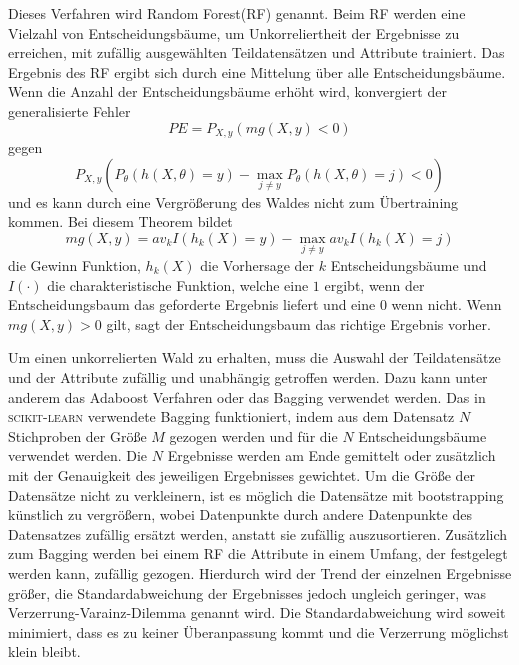 Dieses Verfahren wird Random Forest(RF) genannt. Beim RF werden eine Vielzahl von Entscheidungsbäume, um Unkorreliertheit der Ergebnisse zu erreichen, mit
zufällig ausgewählten Teildatensätzen und Attribute trainiert. Das Ergebnis des RF ergibt sich durch eine Mittelung über alle Entscheidungsbäume.
Wenn die Anzahl der Entscheidungsbäume erhöht wird, konvergiert der generalisierte Fehler
\begin{equation}
  PE = P_{X,y}(mg(X,y)<0)
\end{equation}
gegen
\begin{equation}
  P_{X,y}(P_\theta(h(X,\theta)=y)-\max_{j\neq y}P_\theta(h(X,\theta)=j)<0)
\end{equation}
und es kann durch eine Vergrößerung des Waldes nicht zum Übertraining kommen\cite[7]{RandomForests_Breiman}. Bei diesem Theorem bildet
\begin{equation}
  mg(X,y) = av_k I(h_k(X)=y) - \max_{j \neq y}av_k I(h_k(X)=j)
\end{equation}
die Gewinn Funktion, $h_k(X)$ die Vorhersage der $k$ Entscheidungsbäume und $I(\cdot)$ die charakteristische Funktion, welche eine $1$ ergibt, wenn der
Entscheidungsbaum das geforderte Ergebnis liefert und eine $0$ wenn nicht.
Wenn $mg(X,y) > 0$ gilt, sagt der Entscheidungsbaum das richtige Ergebnis vorher.

Um einen unkorrelierten Wald zu erhalten, muss die Auswahl der Teildatensätze und der Attribute zufällig und unabhängig getroffen werden.
Dazu kann unter anderem das Adaboost Verfahren oder das Bagging verwendet werden.
Das in \textsc{scikit-learn} verwendete Bagging funktioniert, indem aus dem Datensatz $N$ Stichproben der Größe $M$ gezogen werden und für die $N$ Entscheidungsbäume verwendet werden.
Die $N$ Ergebnisse werden am Ende gemittelt oder zusätzlich mit der Genauigkeit des jeweiligen Ergebnisses gewichtet.
Um die Größe der Datensätze nicht zu verkleinern, ist es möglich die Datensätze mit bootstrapping künstlich zu vergrößern, wobei Datenpunkte durch andere Datenpunkte
des Datensatzes zufällig ersätzt werden, anstatt sie zufällig auszusortieren.
Zusätzlich zum Bagging werden bei einem RF die Attribute in einem Umfang, der festgelegt werden kann, zufällig gezogen.
Hierdurch wird der Trend der einzelnen Ergebnisse größer, die Standardabweichung der Ergebnisses jedoch ungleich geringer,
was Verzerrung-Varainz-Dilemma genannt wird. Die Standardabweichung wird soweit minimiert, dass es zu keiner Überanpassung kommt
und die Verzerrung möglichst klein bleibt.

